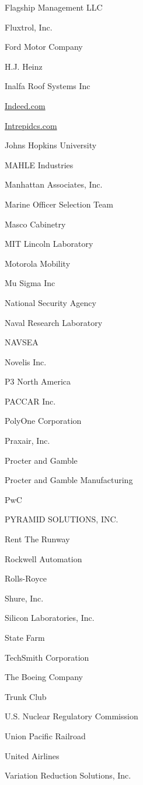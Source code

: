 \documentclass[twoside]{article}
\begin{document}
\begin{center}
\begin{multicols}{5}
\begin{FlushLeft}
\begin{compactitem}
\item Flagship Management LLC
\item Fluxtrol, Inc.
\item Ford Motor Company
\item H.J. Heinz
\item Inalfa Roof Systems Inc
\item \url{Indeed.com}
\item \url{Intrepidcs.com}
\item Johns Hopkins University
\item MAHLE Industries
\item Manhattan Associates, Inc.
\item Marine Officer Selection Team
\item Masco Cabinetry
\item MIT Lincoln Laboratory
\item Motorola Mobility
\item Mu Sigma Inc
\item National Security Agency
\item Naval Research Laboratory
\item NAVSEA
\item Novelis Inc.
\item P3 North America
\item PACCAR Inc.
\item PolyOne Corporation
\item Praxair, Inc.
\item Procter and Gamble
\item Procter and Gamble Manufacturing
\item PwC
\item PYRAMID SOLUTIONS, INC.
\item Rent The Runway
\item Rockwell Automation
\item Rolls-Royce
\item Shure, Inc.
\item Silicon Laboratories, Inc.
\item State Farm
\item TechSmith Corporation
\item The Boeing Company
\item Trunk Club
\item U.S. Nuclear Regulatory Commission
\item Union Pacific Railroad
\item United Airlines
\item Variation Reduction Solutions, Inc.

\end{compactitem}
\end{FlushLeft}
\end{multicols}
\end{center}
\end{document}
